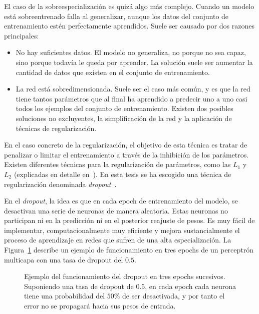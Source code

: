 El caso de la sobreespecialización es quizá algo más complejo. Cuando un modelo está sobreentrenado falla al generalizar, aunque los datos del conjunto de entrenamiento estén perfectamente aprendidos. Suele ser causado por dos razones principales:

\begin{itemize}
	\item No hay suficientes datos. El modelo no generaliza, no porque no sea capaz, sino porque todavía le queda por aprender. La solución suele ser aumentar la cantidad de datos que existen en el conjunto de entrenamiento.
	\item La red está sobredimensionada. Suele ser el caso más común, y es que la red tiene tantos parámetros que al final ha aprendido a predecir uno a uno casi todos los ejemplos del conjunto de entrenamiento. Existen dos posibles soluciones no excluyentes, la simplificación de la red y la aplicación de técnicas de regularización.
\end{itemize}

En el caso concreto de la regularización, el objetivo de esta técnica es tratar de penalizar o limitar el entrenamiento a través de la inhibición de los parámetros. Existen diferentes técnicas para la regularización de parámetros, como las $L_1$ y $L_2$ (explicadas en detalle en~\cite{ng2004feature}). En esta tesis se ha escogido una técnica de regularización denominada \textit{dropout}~\cite{srivastava2014dropout}.

En el \textit{dropout}, la idea es que en cada epoch de entrenamiento del modelo, se desactivan una serie de neuronas de manera aleatoria. Estas neuronas no participan ni en la predicción ni en el posterior reajuste de pesos. Es muy fácil de implementar, computacionalmente muy eficiente y mejora sustancialmente el proceso de aprendizaje en redes que sufren de una alta especialización. La Figura~\ref{fig:dropout-example} describe un ejemplo de funcionamiento en tres epochs de un perceptrón multicapa con una tasa de dropout del $0.5$.

\begin{figure}
	\centering
	\qquad
	\qquad
	\caption[Ejemplo de la operación de dropout para tres epochs sucesivos]{Ejemplo del funcionamiento del dropout en tres epochs sucesivos. Suponiendo una tasa de dropout de $0.5$, en cada epoch cada neurona tiene una probabilidad del $50\%$ de ser desactivada, y por tanto el error no se propagará hacia sus pesos de entrada.}
	\label{fig:dropout-example}
\end{figure}

